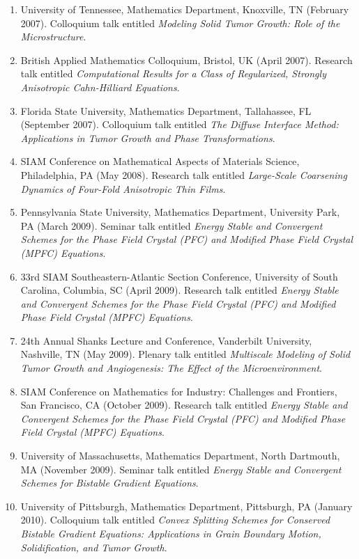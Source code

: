 \documentclass[11pt]{letter}
\begin{document}
\begin{enumerate}
    \item
University of Tennessee, Mathematics Department, Knoxville, TN (February 2007).  Colloquium talk entitled {\sl Modeling Solid Tumor Growth: Role of the Microstructure}.
    \item
British Applied Mathematics Colloquium, Bristol, UK (April 2007).  Research talk entitled {\sl Computational Results for a Class of Regularized, Strongly Anisotropic Cahn-Hilliard Equations}.
    \item
Florida State University, Mathematics Department, Tallahassee, FL (September 2007).  Colloquium talk entitled {\sl The Diffuse Interface Method: Applications in Tumor Growth and Phase Transformations}.
	\item
SIAM Conference on Mathematical Aspects of Materials Science, Philadelphia, PA (May 2008). Research talk entitled {\sl Large-Scale Coarsening Dynamics of Four-Fold Anisotropic Thin Films}.
    \item
Pennsylvania State University, Mathematics Department, University Park, PA (March 2009).  Seminar talk entitled {\sl Energy Stable and Convergent Schemes for the Phase Field Crystal (PFC) and Modified Phase Field Crystal (MPFC) Equations}.
	\item
33rd SIAM Southeastern-Atlantic Section Conference, University of South Carolina, Columbia, SC (April 2009).  Research talk entitled {\sl Energy Stable and Convergent Schemes for the Phase Field Crystal (PFC) and Modified Phase Field Crystal (MPFC) Equations}.
	\item
24th Annual Shanks Lecture and Conference, Vanderbilt University, Nashville, TN (May 2009). Plenary talk entitled {\sl Multiscale Modeling of Solid Tumor Growth and Angiogenesis: The Effect of the Microenvironment}.
	\item
SIAM Conference on Mathematics for Industry: Challenges and Frontiers, San Francisco, CA (October 2009). Research talk entitled {\sl Energy Stable and Convergent Schemes for the Phase Field Crystal (PFC) and Modified Phase Field Crystal (MPFC) Equations}.
    \item
University of Massachusetts, Mathematics Department, North Dartmouth, MA (November 2009).  Seminar talk entitled {\sl Energy Stable and Convergent Schemes for Bistable Gradient Equations}.
    \item
University of Pittsburgh, Mathematics Department, Pittsburgh, PA (January 2010).  Colloquium talk entitled {\sl Convex Splitting Schemes for Conserved Bistable Gradient Equations: Applications in Grain Boundary Motion, Solidification, and Tumor Growth}.

\end{enumerate}
\end{document}
